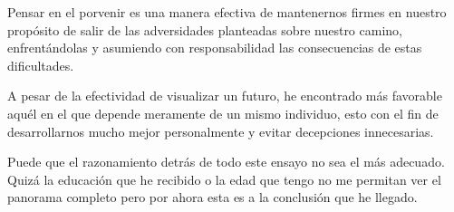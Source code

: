 \documentclass[12pt, letterpaper]{article}
\begin{document}
Pensar en el porvenir es una manera efectiva de mantenernos firmes en nuestro propósito de salir de las adversidades planteadas sobre nuestro camino,  enfrentándolas y asumiendo con responsabilidad las consecuencias de estas dificultades.

A pesar de la efectividad de visualizar un futuro, he encontrado más favorable aquél en el que depende meramente de un mismo individuo, esto con el fin de desarrollarnos mucho mejor personalmente y evitar decepciones innecesarias. 

Puede que el razonamiento detrás de todo este ensayo no sea el más adecuado. Quizá la educación que he recibido o la edad que tengo no me permitan ver el panorama completo pero por ahora esta es a la conclusión que he llegado.
\newpage
{}
\renewcommand\refname{Referencias}
\printbibliography
\end{document}
